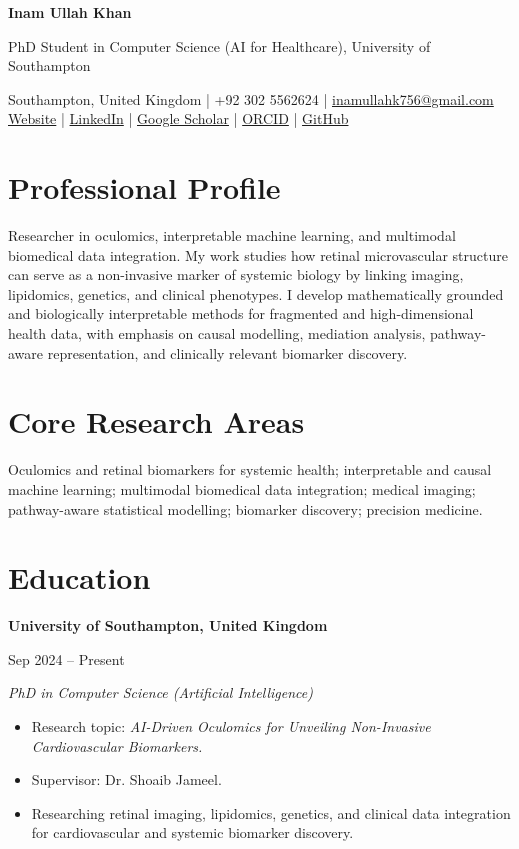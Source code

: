 \documentclass[11pt,a4paper]{article}
\newcommand{\nameheader}[1]{{\fontsize{24}{26}\selectfont\bfseries\color{cvnavy} #1}}
\newcommand{\roleheader}[1]{{\normalsize\color{cvtext} #1}}
\newcommand{\entry}[4]{
  \textbf{#1}\par
  {\small\color{cvmuted}#2}\par
  \emph{#3}%
  \if\relax\detokenize{#4}\relax\else\hfill{\small\color{cvmuted}\emph{#4}}\fi\par
  \vspace{0.08em}
}
\newcommand{\contactline}[1]{{\small #1}}
\begin{document}
\color{cvtext}
\small

\begin{center}
\nameheader{Inam Ullah Khan}

\vspace{0.2em}
\roleheader{PhD Student in Computer Science (AI for Healthcare), University of Southampton}

\vspace{0.35em}
\contactline{Southampton, United Kingdom \quad | \quad +92 302 5562624 \quad | \quad \href{mailto:inamullahk756@gmail.com}{inamullahk756@gmail.com}}\\[0.18em]
\contactline{\href{https://inamullah-colab.github.io/}{Website} \quad | \quad \href{https://www.linkedin.com/in/inam-ullah-khan-a30532150/}{LinkedIn} \quad | \quad \href{https://scholar.google.com/citations?user=PRKY9rYAAAAJ&hl=en}{Google Scholar} \quad | \quad \href{https://orcid.org/0009-0004-4458-8777}{ORCID} \quad | \quad \href{https://github.com/Inamullah-Colab}{GitHub}}
\end{center}

\vspace{0.3em}

\section*{Professional Profile}
\justifying
Researcher in oculomics, interpretable machine learning, and multimodal biomedical data integration. My work studies how retinal microvascular structure can serve as a non-invasive marker of systemic biology by linking imaging, lipidomics, genetics, and clinical phenotypes. I develop mathematically grounded and biologically interpretable methods for fragmented and high-dimensional health data, with emphasis on causal modelling, mediation analysis, pathway-aware representation, and clinically relevant biomarker discovery.

\section*{Core Research Areas}
Oculomics and retinal biomarkers for systemic health; interpretable and causal machine learning; multimodal biomedical data integration; medical imaging; pathway-aware statistical modelling; biomarker discovery; precision medicine.

\section*{Education}
\entry{University of Southampton, United Kingdom}{Sep 2024 -- Present}{PhD in Computer Science (Artificial Intelligence)}{}
\begin{itemize}
  \item Research topic: \emph{AI-Driven Oculomics for Unveiling Non-Invasive Cardiovascular Biomarkers.}
  \item Supervisor: Dr. Shoaib Jameel.
  \item Researching retinal imaging, lipidomics, genetics, and clinical data integration for cardiovascular and systemic biomarker discovery.
\end{itemize}
\end{document}
